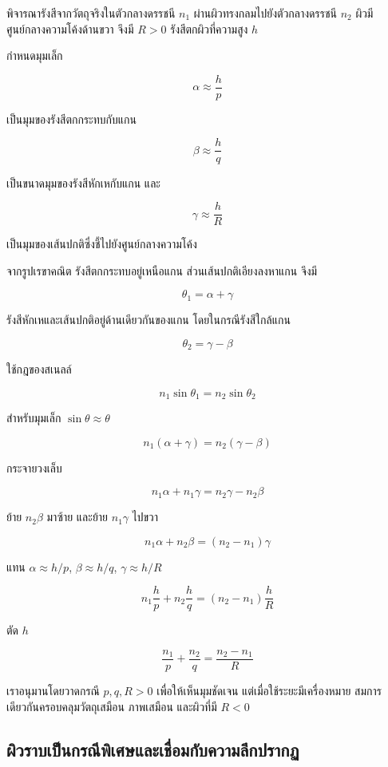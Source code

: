 พิจารณารังสีจากวัตถุจริงในตัวกลางดรรชนี $n_1$ ผ่านผิวทรงกลมไปยังตัวกลางดรรชนี $n_2$ ผิวมีศูนย์กลางความโค้งด้านขวา จึงมี $R>0$ รังสีตกผิวที่ความสูง $h$

กำหนดมุมเล็ก

\[
\alpha\approx\frac{h}{p}
\]

เป็นมุมของรังสีตกกระทบกับแกน

\[
\beta\approx\frac{h}{q}
\]

เป็นขนาดมุมของรังสีหักเหกับแกน และ

\[
\gamma\approx\frac{h}{R}
\]

เป็นมุมของเส้นปกติซึ่งชี้ไปยังศูนย์กลางความโค้ง

จากรูปเรขาคณิต รังสีตกกระทบอยู่เหนือแกน ส่วนเส้นปกติเอียงลงหาแกน จึงมี

\[
\theta_1=\alpha+\gamma
\]

รังสีหักเหและเส้นปกติอยู่ด้านเดียวกันของแกน โดยในกรณีรังสีใกล้แกน

\[
\theta_2=\gamma-\beta
\]

ใช้กฎของสเนลล์

\[
n_1\sin\theta_1=n_2\sin\theta_2
\]

สำหรับมุมเล็ก $\sin\theta\approx\theta$

\[
n_1(\alpha+\gamma)
=
n_2(\gamma-\beta)
\]

กระจายวงเล็บ

\[
n_1\alpha+n_1\gamma
=
n_2\gamma-n_2\beta
\]

ย้าย $n_2\beta$ มาซ้าย และย้าย $n_1\gamma$ ไปขวา

\[
n_1\alpha+n_2\beta
=(n_2-n_1)\gamma
\]

แทน $\alpha\approx h/p$, $\beta\approx h/q$, $\gamma\approx h/R$

\[
n_1\frac{h}{p}
+n_2\frac{h}{q}
=(n_2-n_1)\frac{h}{R}
\]

ตัด $h$

\begin{tcolorbox}[title={การหักเหที่ผิวทรงกลม}]
\[
\boxed{
\frac{n_1}{p}
+
\frac{n_2}{q}
=
\frac{n_2-n_1}{R}}
\]
\end{tcolorbox}

เราอนุมานโดยวาดกรณี $p,q,R>0$ เพื่อให้เห็นมุมชัดเจน แต่เมื่อใช้ระยะมีเครื่องหมาย สมการเดียวกันครอบคลุมวัตถุเสมือน ภาพเสมือน และผิวที่มี $R<0$

\subsection{ผิวราบเป็นกรณีพิเศษและเชื่อมกับความลึกปรากฏ}

